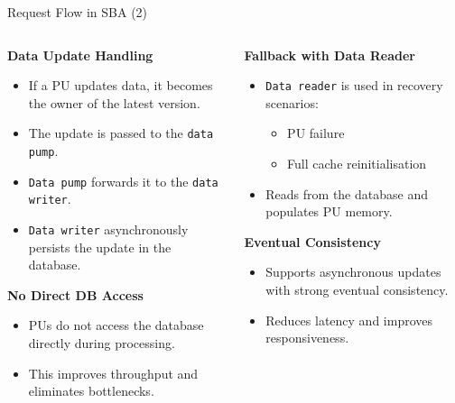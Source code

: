 \documentclass[aspectratio=169, table]{beamer}
\begin{document}
	\begin{frame}{Request Flow in SBA (2)}
		\vspace{20pt}
		\begin{columns}[t]
			\begin{column}{0.6\textwidth}
				\textbf{Data Update Handling}
				\begin{itemize}
					\item If a PU updates data, it becomes the owner of the latest version.
					\item The update is passed to the \texttt{data pump}.
					\item \texttt{Data pump} forwards it to the \texttt{data writer}.
					\item \texttt{Data writer} asynchronously persists the update in the database.
				\end{itemize}
				
				\textbf{No Direct DB Access}
				\begin{itemize}
					\item PUs do not access the database directly during processing.
					\item This improves throughput and eliminates bottlenecks.
				\end{itemize}
			\end{column}
			
			\begin{column}{0.4\textwidth}
				\textbf{Fallback with Data Reader}
				\begin{itemize}
					\item \texttt{Data reader} is used in recovery scenarios:
					\begin{itemize}
						\item PU failure
						\item Full cache reinitialisation
					\end{itemize}
					\item Reads from the database and populates PU memory.
				\end{itemize}
				
				\textbf{Eventual Consistency}
				\begin{itemize}
					\item Supports asynchronous updates with strong eventual consistency.
					\item Reduces latency and improves responsiveness.
				\end{itemize}
			\end{column}
		\end{columns}
	\end{frame}
	
\end{document}
